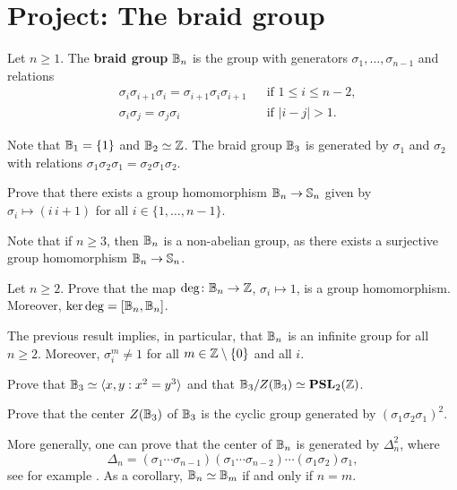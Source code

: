 \section{Project: The braid group}

\begin{definition}
    Let $n\geq1$. The \textbf{braid group} $\mathbb{B}_n$ is
    the group with generators $\sigma_1,\dots,\sigma_{n-1}$ and
    relations
    \begin{align*}
        &\sigma_i\sigma_{i+1}\sigma_i=\sigma_{i+1}\sigma_i\sigma_{i+1} && \text{if }1\leq i\leq n-2,\\
        &\sigma_i\sigma_j=\sigma_j\sigma_i && \text{if }|i-j|> 1.
    \end{align*}
\end{definition}

Note that $\mathbb{B}_1=\{1\}$ and $\mathbb{B}_2\simeq\mathbb{Z}$. The braid 
group $\mathbb{B}_3$ is generated by
$\sigma_1$ and $\sigma_2$ with relations
$\sigma_1\sigma_2\sigma_1=\sigma_2\sigma_1\sigma_2$.

\begin{exercise}
    Prove that there exists a group homomorphism $\mathbb{B}_n\to\mathbb{S}_n$ 
    given by $\sigma_i\mapsto (i\,i+1)$ for all $i\in\{1,\dots,n-1\}$. 
\end{exercise}

Note that if $n\geq3$, then 
$\mathbb{B}_n$ is a non-abelian group, as there exists a surjective
group homomorphism $\mathbb{B}_n\to\mathbb{S}_n$. 

\begin{exercise}
    Let $n\geq 2$. 
    Prove that the map $\deg\colon\mathbb{B}_n\to\mathbb{Z}$, $\sigma_i\mapsto 1$, 
    is a group homomorphism. Moreover, $\ker\deg=[\mathbb{B}_n,\mathbb{B}_n]$. 
\end{exercise}

The previous result implies, in particular, that $\mathbb{B}_n$ is an infinite 
group for all $n\geq2$. Moreover, $\sigma_i^m\ne1$ for all $m\in\mathbb{Z}\setminus\{0\}$ and all $i$.  

\begin{exercise}
    Prove that $\mathbb{B}_3\simeq\langle x,y:x^2=y^3\rangle$ and that 
    $\mathbb{B}_3/Z(\mathbb{B}_3)\simeq\mathbf{PSL}_2(\mathbb{Z})$. 
\end{exercise}

\begin{exercise}
    Prove that the center $Z(\mathbb{B}_3)$ of $\mathbb{B}_3$ is
    the cyclic group generated by $(\sigma_1\sigma_2\sigma_1)^2$.
\end{exercise}

More generally, one can prove that
the center of $\mathbb{B}_n$ is generated by $\Delta_n^2$, where
\[
\Delta_n=(\sigma_1\cdots\sigma_{n-1})(\sigma_1\cdots\sigma_{n-2})\cdots(\sigma_1\sigma_2)\sigma_1, 
\]
see for example \cite[Theorem 1.24]{MR2435235}. 
As a corollary, $\mathbb{B}_n\simeq\mathbb{B}_m$ if and only if $n=m$. 

